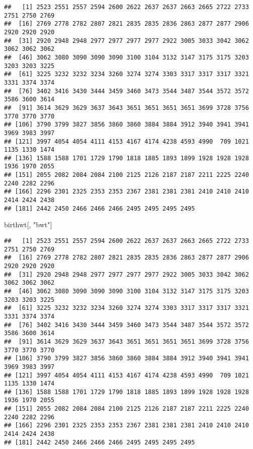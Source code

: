 \documentclass[]{book}
\newenvironment{Shaded}{\begin{snugshade}}{\end{snugshade}}
\newcommand{\NormalTok}[1]{#1}
\newcommand{\OperatorTok}[1]{\textcolor[rgb]{0.81,0.36,0.00}{\textbf{#1}}}
\newcommand{\StringTok}[1]{\textcolor[rgb]{0.31,0.60,0.02}{#1}}
\begin{document}
\begin{Shaded}
\end{Shaded}

\begin{verbatim}
##   [1] 2523 2551 2557 2594 2600 2622 2637 2637 2663 2665 2722 2733 2751 2750 2769
##  [16] 2769 2778 2782 2807 2821 2835 2835 2836 2863 2877 2877 2906 2920 2920 2920
##  [31] 2920 2948 2948 2977 2977 2977 2977 2922 3005 3033 3042 3062 3062 3062 3062
##  [46] 3062 3080 3090 3090 3090 3100 3104 3132 3147 3175 3175 3203 3203 3203 3225
##  [61] 3225 3232 3232 3234 3260 3274 3274 3303 3317 3317 3317 3321 3331 3374 3374
##  [76] 3402 3416 3430 3444 3459 3460 3473 3544 3487 3544 3572 3572 3586 3600 3614
##  [91] 3614 3629 3629 3637 3643 3651 3651 3651 3651 3699 3728 3756 3770 3770 3770
## [106] 3790 3799 3827 3856 3860 3860 3884 3884 3912 3940 3941 3941 3969 3983 3997
## [121] 3997 4054 4054 4111 4153 4167 4174 4238 4593 4990  709 1021 1135 1330 1474
## [136] 1588 1588 1701 1729 1790 1818 1885 1893 1899 1928 1928 1928 1936 1970 2055
## [151] 2055 2082 2084 2084 2100 2125 2126 2187 2187 2211 2225 2240 2240 2282 2296
## [166] 2296 2301 2325 2353 2353 2367 2381 2381 2381 2410 2410 2410 2414 2424 2438
## [181] 2442 2450 2466 2466 2466 2495 2495 2495 2495
\end{verbatim}

\begin{Shaded}
\begin{Highlighting}[]
\NormalTok{birthwt[, }\StringTok{"bwt"}\NormalTok{]}
\end{Highlighting}
\end{Shaded}

\begin{verbatim}
##   [1] 2523 2551 2557 2594 2600 2622 2637 2637 2663 2665 2722 2733 2751 2750 2769
##  [16] 2769 2778 2782 2807 2821 2835 2835 2836 2863 2877 2877 2906 2920 2920 2920
##  [31] 2920 2948 2948 2977 2977 2977 2977 2922 3005 3033 3042 3062 3062 3062 3062
##  [46] 3062 3080 3090 3090 3090 3100 3104 3132 3147 3175 3175 3203 3203 3203 3225
##  [61] 3225 3232 3232 3234 3260 3274 3274 3303 3317 3317 3317 3321 3331 3374 3374
##  [76] 3402 3416 3430 3444 3459 3460 3473 3544 3487 3544 3572 3572 3586 3600 3614
##  [91] 3614 3629 3629 3637 3643 3651 3651 3651 3651 3699 3728 3756 3770 3770 3770
## [106] 3790 3799 3827 3856 3860 3860 3884 3884 3912 3940 3941 3941 3969 3983 3997
## [121] 3997 4054 4054 4111 4153 4167 4174 4238 4593 4990  709 1021 1135 1330 1474
## [136] 1588 1588 1701 1729 1790 1818 1885 1893 1899 1928 1928 1928 1936 1970 2055
## [151] 2055 2082 2084 2084 2100 2125 2126 2187 2187 2211 2225 2240 2240 2282 2296
## [166] 2296 2301 2325 2353 2353 2367 2381 2381 2381 2410 2410 2410 2414 2424 2438
## [181] 2442 2450 2466 2466 2466 2495 2495 2495 2495
\end{verbatim}
\end{document}
